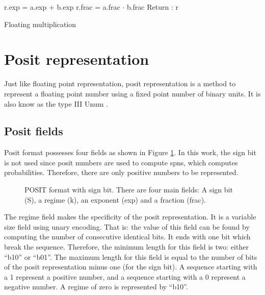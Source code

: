 \begin{algorithm}[H]
\SetAlgoLined
{}
r.exp = a.exp + b.exp\;
r.frac = a.frac $\cdot$ b.frac\;
Return : r\;
\caption{Floating multiplication}
\label{alg:float_mult}
\end{algorithm}


\section{Posit representation}

Just like floating point representation, posit representation is a method to represent a floating point number using a fixed point number of binary units. It is also know as the type III \gls{Unum} \cite{unum_wiki}.

\subsection{Posit fields}

Posit format possesses four fields as shown in Figure \ref{fig:posit_shema}. In this work, the sign bit is not used since posit numbers are used to compute \glspl{spn}, which computes probabilities. Therefore, there are only positive numbers to be represented.

\begin{figure}[!ht]
\begin{mdframed}
\centering

\caption{POSIT format with sign bit. There are four main fields: A sign bit (S), a regime (k), an exponent (exp) and a fraction (frac).}
\label{fig:posit_shema}
\end{mdframed}
\end{figure}

The regime field makes the specificity of the posit representation. It is a variable size field using unary encoding. That is: the value of this field can be found by computing the number of consecutive identical bits. It ends with one bit which break the sequence. Therefore, the minimum length for this field is two: either ``b10'' or ``b01''. The maximum length for this field is equal to the number of bits of the posit representation minus one (for the sign bit). A sequence starting with a 1 represent a positive number, and a sequence starting with a 0 represent a negative number. A regime of zero is represented by ``b10''.

